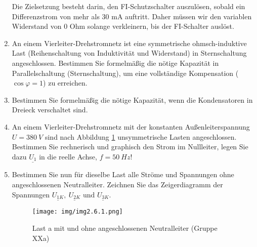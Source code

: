 \begin{enumerate}[label=\alph*)]
{	\renewcommand{\abstractname}{Herleitung zum FI-Tester}
	\begin{abstract}
	\end{abstract}
	}
	
	Die Zielsetzung besteht darin, den FI-Schutzschalter auszulösen, sobald ein Differenzstrom von mehr als 30 mA auftritt. Daher müssen wir den variablen Widerstand von 0 Ohm solange verkleinern, bis der FI-Schalter auslöst.

  \item An einem Vierleiter-Drehstromnetz ist eine symmetrische ohmsch-induktive Last (Reihenschaltung von Induktivität und Widerstand) in Sternschaltung angeschlossen. Bestimmen Sie formelmäßig die nötige Kapazität in Parallelschaltung (Sternschaltung), um eine vollständige Kompensation ($\cos \varphi = 1$) zu erreichen. 

  \item Bestimmen Sie formelmäßig die nötige Kapazität, wenn die Kondensatoren in Dreieck verschaltet sind.

  \item An einem Vierleiter-Drehstromnetz mit der konstanten Außenleiterspannung $U = 380\ V$ sind nach Abbildung \ref{img2.6.1} unsymmetrische Lasten angeschlossen. Bestimmen Sie rechnerisch und graphisch den Strom im Nullleiter, legen Sie dazu $\underline{U_1}$ in die reelle Achse, $f = 50\ Hz$!

\item Bestimmen Sie nun für dieselbe Last alle Ströme und Spannungen ohne angeschlossenen Neutralleiter. Zeichnen Sie das Zeigerdiagramm der Spannungen $\underline{U_{1K}},\ \underline{U_{2K}} \text{ und } \underline{U_{3K}}$. 
  \begin{figure}[h!]
    \begin{center}
      \texttt{[image: img/img2.6.1.png]}
    \end{center}
    \caption{Last a mit und ohne angeschlossenen Neutralleiter (Gruppe XXa)}\label{img2.6.1}
  \end{figure}
  
\end{enumerate}
